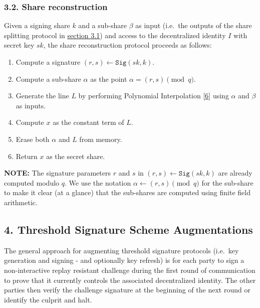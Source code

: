 \documentclass[
]{article}
\providecommand{\tightlist}{%
  \setlength{\itemsep}{0pt}\setlength{\parskip}{0pt}}
\begin{document}
\hypertarget{share-reconstruction}{%
\subsubsection{3.2. Share reconstruction}\label{share-reconstruction}}

Given a signing share \(k\) and a sub-share \(\beta\) as input (i.e.~the
outputs of the share splitting protocol in
\protect\hyperlink{share-splitting}{section 3.1}) and access to the
decentralized identity \(I\) with secret key \(sk\), the share
reconstruction protocol proceeds as follows:

\begin{enumerate}
\def\labelenumi{\arabic{enumi}.}
\tightlist
\item
  Compute a signature \((r, s) \leftarrow \mathtt{Sig}(sk, k)\).
\item
  Compute a sub-share \(\alpha\) as the point
  \(\alpha = (r, s) \pmod q\).
\item
  Generate the line \(L\) by performing Polynomial Interpolation
  {[}\protect\hyperlink{ref-wiki:interpolation}{6}{]} using \(\alpha\)
  and \(\beta\) as inputs.
\item
  Compute \(x\) as the constant term of \(L\).
\item
  Erase both \(\alpha\) and \(L\) from memory.
\item
  Return \(x\) as the secret share.
\end{enumerate}

\textbf{NOTE:} The signature parameters \(r\) and \(s\) in
\((r, s) \leftarrow \mathtt{Sig}(sk, k)\) are already computed modulo
\(q\). We use the notation \(\alpha \leftarrow (r, s) \pmod q\) for the
sub-share to make it clear (at a glance) that the sub-shares are
computed using finite field arithmetic.

\hypertarget{augmentations}{%
\subsection{4. Threshold Signature Scheme
Augmentations}\label{augmentations}}

The general approach for augmenting threshold signature protocols
(i.e.~key generation and signing - and optionally key refresh) is for
each party to sign a non-interactive replay resistant challenge during
the first round of communication to prove that it currently controls the
associated decentralized identity. The other parties then verify the
challenge signature at the beginning of the next round or identify the
culprit and halt.
\end{document}
